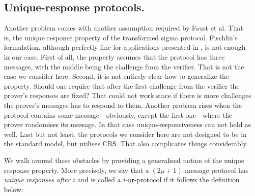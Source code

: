 \let\accentvec\vec \documentclass[runningheads,10pt]{llncs}
\begin{document}
\subsection{Unique-response protocols.}
Another problem comes with another assumption required by Faust et al. That is, the unique response property of the transformed sigma protocol.
Fischlin's formulation, although perfectly fine for applications presented in
\cite{C:Fischlin05,INDOCRYPT:FKMV12}, is not enough in our case.  First of all, the property
assumes that the protocol has three messages, with
the middle being the challenge from the verifier. That is not the case we
consider here. Second, it is not entirely clear how to generalize the
property. Should one require that after the first challenge from the verifier
the prover's responses are fixed? That could not work since if there is more
challenges the prover's messages has to respond to them.  Another problem rises when the protocol
contains some message---obviously, except the first one---where the prover
randomises its message. In that case unique-responsiveness can not hold as
well.  Last but not least, the protocols we consider here are not designed to
be in the standard model, but utilises CRS. That also complicates things
considerably.

We walk around these obstacles by providing a generalised notion of the unique
response property.  More precisely, we say that a $(2\mu + 1)$-message protocol
has \emph{unique responses after $i$} and is called a ${i\text{-}\mathsf{ur}}$-protocol if it
follows the definition below:
\end{document}
